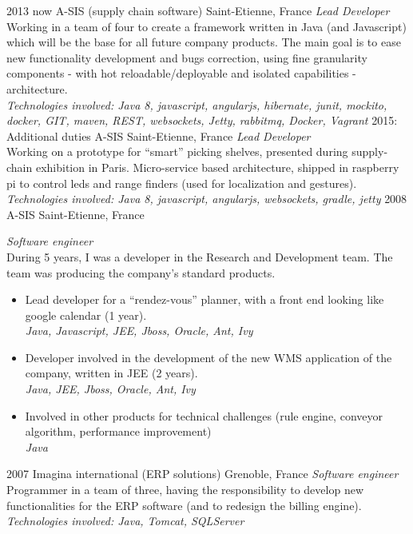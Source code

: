 \documentclass[]{k-cv} %
\begin{document}
\begin{entrylist}
\entry
{2013 \to now}
{A-SIS (supply chain software)}
{Saint-Etienne, France}
{\emph{Lead Developer} \\
Working in a team of four to create a framework written in Java (and Javascript) which
 will be the base for all future company products.
The main goal is to ease new functionality development and bugs correction,
  using fine granularity components - with hot reloadable/deployable and isolated capabilities - architecture. \\
\emph{
Technologies involved:
Java 8, javascript, angularjs, hibernate, junit, mockito, docker,
GIT, maven, REST, websockets, Jetty, rabbitmq, Docker, Vagrant
}}
\entry
{2015: Additional duties}
{A-SIS}
{Saint-Etienne, France}
{\emph{Lead Developer} \\
Working on a prototype for ``smart'' picking shelves, presented during supply-chain exhibition in Paris.
Micro-service based architecture, shipped in raspberry pi to control leds and range finders
(used for localization and gestures). \\
\emph{
Technologies involved:
Java 8, javascript, angularjs, websockets,  gradle, jetty
}}
\entry
{2008 }
{A-SIS}
{Saint-Etienne, France}
{\emph{Software engineer} \\
During 5 years, I was a developer in the Research and Development team.
The team was producing the company’s standard products.
\begin{itemize}
\item
Lead developer for a ``rendez-vous'' planner, with a front end looking like google calendar (1 year). \\
\emph{Java, Javascript, JEE, Jboss, Oracle, Ant, Ivy}
\item
Developer involved in the development of the new WMS application of the company, written in JEE (2 years). \\
\emph{Java, JEE, Jboss, Oracle, Ant, Ivy}
\item
Involved in other products for technical challenges (rule engine, conveyor algorithm, performance improvement) \\
\emph{Java}
\end{itemize}}
\entry
{2007 }
{Imagina international (ERP solutions)}
{Grenoble, France}
{\emph{Software engineer} \\
Programmer in a team of three, having the responsibility to develop
new functionalities for the ERP software (and to redesign the billing engine). \\
\emph{
Technologies involved:
Java, Tomcat, SQLServer
}}
\end{entrylist}
\end{document}
